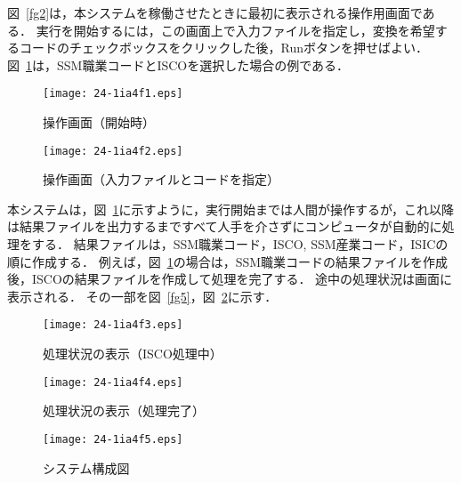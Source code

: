 \documentclass[japanese]{jnlp_1.4}
\begin{document}
図~\ref{fg2}は，本システムを稼働させたときに最初に表示される操作用画面である．
実行を開始するには，この画面上で入力ファイルを指定し，変換を希望するコードのチェックボックスをクリックした後，Runボタンを押せばよい．
図~\ref{fg3}は，SSM職業コードとISCOを選択した場合の例である．

\begin{figure}[t]
\noindent
\begin{minipage}{0.45\textwidth}
\begin{center}
\texttt{[image: 24-1ia4f1.eps]}
\caption{操作画面（開始時）}
\label{fg2}
\end{center}
\end{minipage}
\hfill
\begin{minipage}{0.45\textwidth}
\begin{center}
\texttt{[image: 24-1ia4f2.eps]}
\caption{操作画面（入力ファイルとコードを指定）}
\label{fg3}
\end{center}
\end{minipage}
\vspace{1\Cvs}
\end{figure} 


本システムは，図~\ref{fg3}に示すように，実行開始までは人間が操作するが，これ以降は結果ファイルを出力するまですべて人手を介さずにコンピュータが自動的に処理をする．
結果ファイルは，SSM職業コード，ISCO, SSM産業コード，ISICの順に作成する．
例えば，図~\ref{fg3}の場合は，SSM職業コードの結果ファイルを作成後，ISCOの結果ファイルを作成して処理を完了する．
途中の処理状況は画面に表示される．
その一部を図~\ref{fg5}，図~\ref{fg6}に示す．

\begin{figure}[t]
\noindent
\begin{minipage}{0.45\textwidth}
\begin{center}
\texttt{[image: 24-1ia4f3.eps]}
\caption{処理状況の表示（ISCO処理中）}
\label{fg5}
\end{center}
\end{minipage}
\hfill
\begin{minipage}{0.45\textwidth}
\begin{center}
\texttt{[image: 24-1ia4f4.eps]}
\caption{処理状況の表示（処理完了）}
\label{fg6}
\end{center}
\end{minipage}
\end{figure} 
\begin{figure}[t]
\begin{center}
\texttt{[image: 24-1ia4f5.eps]}
\end{center}
\caption{システム構成図}
\label{fg1}
\end{figure}
\end{document}
